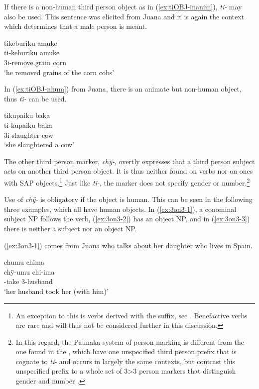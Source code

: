 If there is a non-human third person object as in (\ref{ex:tiOBJ-inanim}), \textit{ti-} may also be used. This sentence was elicited from Juana and it is again the context which determines that a male person is meant.

\ea\label{ex:tiOBJ-inanim}
\begingl 
\glpreamble tikeburiku amuke\\
\gla ti-keburiku amuke\\ 
\glb 3i-remove.grain corn\\ 
\glft ‘he removed grains of the corn cobs’
\trailingcitation{[jxx-e110923l-1.050]}
\xe

In (\ref{ex:tiOBJ-nhum}) from Juana, there is an animate but non-human object, thus \textit{ti-} can be used.

\ea\label{ex:tiOBJ-nhum}
\begingl
\glpreamble tikupaiku baka\\
\gla ti-kupaiku baka\\
\glb 3i-slaughter cow\\
\glft ‘she slaughtered a cow’
\endgl
\trailingcitation{[jxx-p120515l-2.097]}
\xe
 
The other third person marker, \textit{chÿ-}, overtly expresses that a third person subject acts on another third person object. It is thus neither found on  verbs nor on  ones with SAP objects.\footnote{An exception to this is  verbs derived with the  suffix, see . Benefactive verbs are rare and will thus not be considered further in this discussion.} Just like \textit{ti-}, the marker does not specify gender or number.\footnote{In this regard, the Paunaka system of person marking is different from the one found in the , which have one unspecified third person prefix that is cognate to \textit{ti-} and occurs in largely the same contexts, but contrast this unspecified prefix to a whole set of 3>3 person markers that distinguish gender and number \citep[cf.][]{Rose2011a}.} 

Use of \textit{chÿ-} is obligatory if the object is human. This can be seen in the following three examples, which all have human objects. In (\ref{ex:3on3-1}), a conominal subject NP follows the verb, (\ref{ex:3on3-2}) has an object NP, and in (\ref{ex:3on3-3}) there is neither a subject nor an object NP. 

(\ref{ex:3on3-1}) comes from Juana who talks about her daughter who lives in Spain.

\ea\label{ex:3on3-1}
\begingl 
\glpreamble chumu chima\\
\gla chÿ-umu chi-ima\\ 
-take 3-husband\\ 
\glft ‘her husband took her (with him)’
\trailingcitation{[jxx-p110923l-1.240]}
\xe

